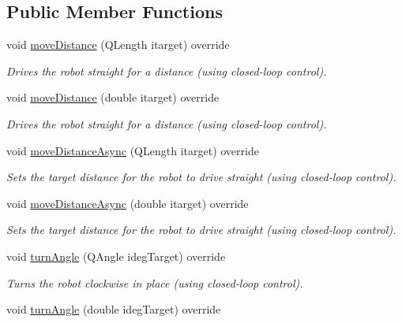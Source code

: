 \subsection*{Public Member Functions}
\begin{DoxyCompactItemize}
\item 
void \mbox{\hyperlink{classokapi_1_1MockChassisController_a551b9b8784735664ed02738b80e897e8}{move\+Distance}} (Q\+Length itarget) override
\begin{DoxyCompactList}\small\item\em Drives the robot straight for a distance (using closed-\/loop control). \end{DoxyCompactList}\item 
void \mbox{\hyperlink{classokapi_1_1MockChassisController_a69ca536bf75a880b76059cc5187e6172}{move\+Distance}} (double itarget) override
\begin{DoxyCompactList}\small\item\em Drives the robot straight for a distance (using closed-\/loop control). \end{DoxyCompactList}\item 
void \mbox{\hyperlink{classokapi_1_1MockChassisController_a7d0f2e65c7c1c58394b825a6fad39a13}{move\+Distance\+Async}} (Q\+Length itarget) override
\begin{DoxyCompactList}\small\item\em Sets the target distance for the robot to drive straight (using closed-\/loop control). \end{DoxyCompactList}\item 
void \mbox{\hyperlink{classokapi_1_1MockChassisController_acd06c9ba237eaef83546066643665642}{move\+Distance\+Async}} (double itarget) override
\begin{DoxyCompactList}\small\item\em Sets the target distance for the robot to drive straight (using closed-\/loop control). \end{DoxyCompactList}\item 
void \mbox{\hyperlink{classokapi_1_1MockChassisController_a26eea2286c67ead1e06f667cc47bbdaf}{turn\+Angle}} (Q\+Angle ideg\+Target) override
\begin{DoxyCompactList}\small\item\em Turns the robot clockwise in place (using closed-\/loop control). \end{DoxyCompactList}\item 
void \mbox{\hyperlink{classokapi_1_1MockChassisController_a4997a97da26d966dcec4f377cfc29434}{turn\+Angle}} (double ideg\+Target) override

\end{DoxyCompactItemize}
